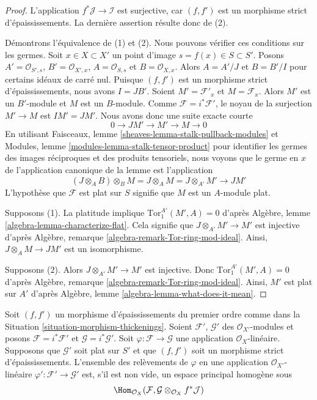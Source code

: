 \begin{proof}
L'application $f^*\mathcal{J} \to \mathcal{I}$ est surjective,
car $(f, f')$ est un morphisme strict d'épaississements.
La dernière assertion résulte donc de (2).

\medskip\noindent
Démontrons l'équivalence de (1) et (2). Nous pouvons vérifier ces conditions
sur les germes. Soit $x \in X \subset X'$
un point d'image $s = f(x) \in S \subset S'$.
Posons $A' = \mathcal{O}_{S', s}$, $B' = \mathcal{O}_{X', x}$,
$A = \mathcal{O}_{S, s}$ et $B = \mathcal{O}_{X, x}$.
Alors $A = A'/J$ et $B = B'/I$ pour certains idéaux de carré nul.
Puisque $(f, f')$ est un morphisme strict d'épaississements, nous avons
$I = JB'$.
Soient $M' = \mathcal{F}'_x$ et $M = \mathcal{F}_x$.
Alors $M'$ est un $B'$-module et $M$ est un $B$-module.
Comme $\mathcal{F} = i^*\mathcal{F}'$, le noyau de la
surjection $M' \to M$ est $IM' = JM'$. Nous avons donc une suite exacte
courte
$$
0 \to JM' \to M' \to M \to 0
$$
En utilisant
Faisceaux, lemme \ref{sheaves-lemma-stalk-pullback-modules}
et
Modules, lemme \ref{modules-lemma-stalk-tensor-product}
pour identifier les germes des images réciproques et des produits tensoriels, nous voyons
que le germe en $x$ de l'application canonique de la lemme est l'application
$$
(J \otimes_A B) \otimes_B M = J \otimes_A M = J \otimes_{A'} M'
\longrightarrow JM'
$$
L'hypothèse que $\mathcal{F}$ est plat sur $S$ signifie que
$M$ est un $A$-module plat.

\medskip\noindent
Supposons (1). La platitude implique
$\text{Tor}_1^{A'}(M', A) = 0$ d'après
Algèbre, lemme \ref{algebra-lemma-characterize-flat}.
Cela signifie que $J \otimes_{A'} M' \to M'$ est injective d'après
Algèbre, remarque \ref{algebra-remark-Tor-ring-mod-ideal}.
Ainsi, $J \otimes_A M \to JM'$ est un isomorphisme.

\medskip\noindent
Supposons (2). Alors $J \otimes_{A'} M' \to M'$ est injective. Donc
$\text{Tor}_1^{A'}(M', A) = 0$ d'après
Algèbre, remarque \ref{algebra-remark-Tor-ring-mod-ideal}.
Ainsi, $M'$ est plat sur $A'$ d'après
Algèbre, lemme \ref{algebra-lemma-what-does-it-mean}.
\end{proof}

\begin{lemma}
\label{lemma-inf-map-rel}
Soit $(f, f')$ un morphisme d'épaississements du premier ordre comme dans la
Situation \ref{situation-morphism-thickenings}.
Soient $\mathcal{F}'$, $\mathcal{G}'$ des $\mathcal{O}_{X'}$-modules et posons
$\mathcal{F} = i^*\mathcal{F}'$ et $\mathcal{G} = i^*\mathcal{G}'$.
Soit $\varphi : \mathcal{F} \to \mathcal{G}$ une application
$\mathcal{O}_X$-linéaire.
Supposons que $\mathcal{G}'$ soit plat sur $S'$ et que
$(f, f')$ soit un morphisme strict d'épaississements.
L'ensemble des relèvements de $\varphi$ en une application
$\mathcal{O}_{X'}$-linéaire
$\varphi' : \mathcal{F}' \to \mathcal{G}'$ est, s'il est non vide, un espace
principal homogène sous
$$
\Hom_{\mathcal{O}_X}(\mathcal{F},
\mathcal{G} \otimes_{\mathcal{O}_X} f^*\mathcal{J})
$$
\end{lemma}

